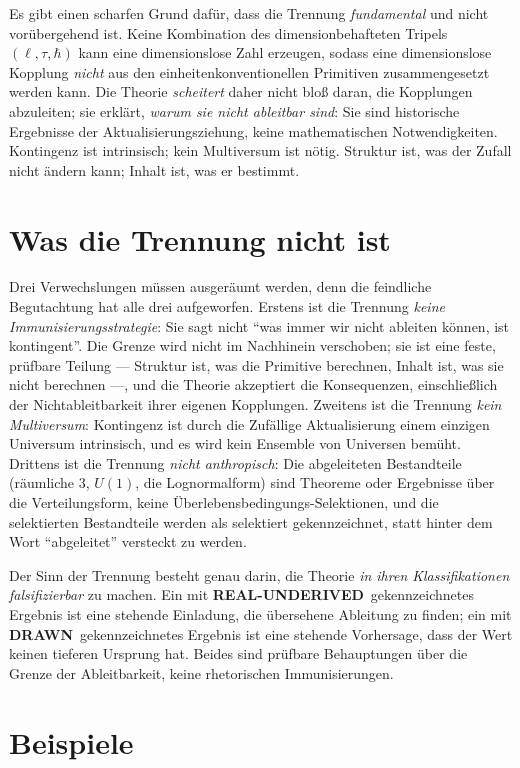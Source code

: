 \documentclass[10pt,twoside,openany]{book}
\newcommand{\realunder}{\textbf{REAL-UNDERIVED}}
\newcommand{\drawn}{\textbf{DRAWN}}
\begin{document}
Es gibt einen scharfen Grund dafür, dass die Trennung \emph{fundamental} und nicht
vorübergehend ist. Keine Kombination des dimensionbehafteten Tripels $(\ell,\tau,\hbar)$
kann eine dimensionslose Zahl erzeugen, sodass eine dimensionslose Kopplung \emph{nicht}
aus den einheitenkonventionellen Primitiven zusammengesetzt werden kann. Die Theorie
\emph{scheitert} daher nicht bloß daran, die Kopplungen abzuleiten; sie erklärt,
\emph{warum sie nicht ableitbar sind}: Sie sind historische Ergebnisse der
Aktualisierungsziehung, keine mathematischen Notwendigkeiten. Kontingenz ist intrinsisch;
kein Multiversum ist nötig. Struktur ist, was der Zufall nicht ändern kann; Inhalt ist,
was er bestimmt.

\section{Was die Trennung nicht ist}

Drei Verwechslungen müssen ausgeräumt werden, denn die feindliche Begutachtung hat alle
drei aufgeworfen. Erstens ist die Trennung \emph{keine Immunisierungsstrategie}: Sie sagt
nicht ``was immer wir nicht ableiten können, ist kontingent''. Die Grenze wird nicht im
Nachhinein verschoben; sie ist eine feste, prüfbare Teilung --- Struktur ist, was die
Primitive berechnen, Inhalt ist, was sie nicht berechnen ---, und die Theorie akzeptiert
die Konsequenzen, einschließlich der Nichtableitbarkeit ihrer eigenen Kopplungen.
Zweitens ist die Trennung \emph{kein Multiversum}: Kontingenz ist durch die Zufällige
Aktualisierung einem einzigen Universum intrinsisch, und es wird kein Ensemble von
Universen bemüht. Drittens ist die Trennung \emph{nicht anthropisch}: Die abgeleiteten
Bestandteile (räumliche $3$, $U(1)$, die Lognormalform) sind Theoreme oder Ergebnisse
über die Verteilungsform, keine Überlebensbedingungs-Selektionen, und die selektierten
Bestandteile werden als selektiert gekennzeichnet, statt hinter dem Wort ``abgeleitet''
versteckt zu werden.

Der Sinn der Trennung besteht genau darin, die Theorie \emph{in ihren Klassifikationen
falsifizierbar} zu machen. Ein mit \realunder\ gekennzeichnetes Ergebnis ist eine
stehende Einladung, die übersehene Ableitung zu finden; ein mit \drawn\ gekennzeichnetes
Ergebnis ist eine stehende Vorhersage, dass der Wert keinen tieferen Ursprung hat. Beides
sind prüfbare Behauptungen über die Grenze der Ableitbarkeit, keine rhetorischen
Immunisierungen.

\section{Beispiele}
\end{document}
